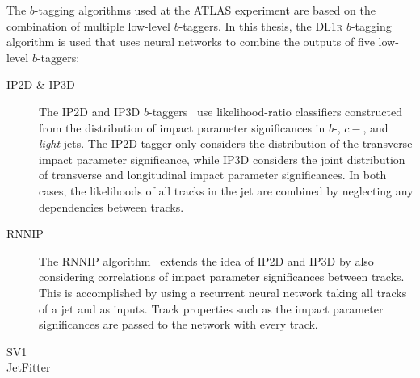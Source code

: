 The $b$-tagging algorithms used at the ATLAS experiment are based on the
combination of multiple low-level $b$-taggers. In this thesis, the \textsc{DL1r}
$b$-tagging algorithm is used that uses neural networks to combine the outputs
of five low-level $b$-taggers:
\begin{description}

\item[IP2D \& IP3D] The \textsc{IP2D} and \textsc{IP3D}
  $b$-taggers~\cite{ATL-PHYS-PUB-2017-013} use likelihood-ratio classifiers
  constructed from the distribution of impact parameter significances in $b$-,
  $c-$, and \emph{light}-jets.  The \textsc{IP2D} tagger only considers the
  distribution of the transverse impact parameter significance, while
  \textsc{IP3D} considers the joint distribution of transverse and longitudinal
  impact parameter significances. In both cases, the likelihoods of all tracks
  in the jet are combined by neglecting any dependencies between tracks.

\item[RNNIP] The \textsc{RNNIP} algorithm~\cite{ATL-PHYS-PUB-2017-003} extends
  the idea of \textsc{IP2D} and \textsc{IP3D} by also considering correlations
  of impact parameter significances between tracks. This is accomplished by
  using a recurrent neural network taking all tracks of a jet and as
  inputs. Track properties such as the impact parameter significances are passed
  to the network with every track.

\item[SV1]

\item[JetFitter]








\end{description}
